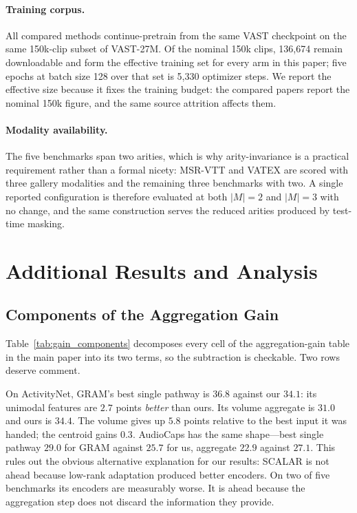 \documentclass[10pt,twocolumn,letterpaper]{article}
\newcommand{\ours}{SCALAR}
\begin{document}
\paragraph{Training corpus.}
All compared methods continue-pretrain from the same VAST checkpoint on the
same 150k-clip subset of VAST-27M. Of the nominal 150k clips, 136{,}674 remain
downloadable and form the effective training set for every arm in this paper;
five epochs at batch size 128 over that set is 5{,}330 optimizer steps. We
report the effective size because it fixes the training budget: the compared
papers report the nominal 150k figure, and the same source attrition affects
them.

\paragraph{Modality availability.}
The five benchmarks span two arities, which is why arity-invariance is a
practical requirement rather than a formal nicety: MSR-VTT and VATEX are scored
with three gallery modalities and the remaining three benchmarks with two. A
single reported configuration is therefore evaluated at both $|M|=2$ and
$|M|=3$ with no change, and the same construction serves the reduced arities
produced by test-time masking.

\section{Additional Results and Analysis}
\label{sec:extra}

\subsection{Components of the Aggregation Gain}
\label{sec:gaincomp}

Table~\ref{tab:gain_components} decomposes every cell of the aggregation-gain
table in the main paper into its two terms, so the subtraction is checkable.
Two rows deserve comment.

On ActivityNet, GRAM's best single pathway is $36.8$ against our $34.1$: its
unimodal features are $2.7$ points \emph{better} than ours. Its volume
aggregate is $31.0$ and ours is $34.4$. The volume gives up $5.8$ points
relative to the best input it was handed; the centroid gains $0.3$. AudioCaps
has the same shape---best single pathway $29.0$ for GRAM against $25.7$ for us,
aggregate $22.9$ against $27.1$. This rules out the obvious alternative
explanation for our results: \ours{} is not ahead because low-rank adaptation
produced better encoders. On two of five benchmarks its encoders are measurably
worse. It is ahead because the aggregation step does not discard the
information they provide.
\end{document}
